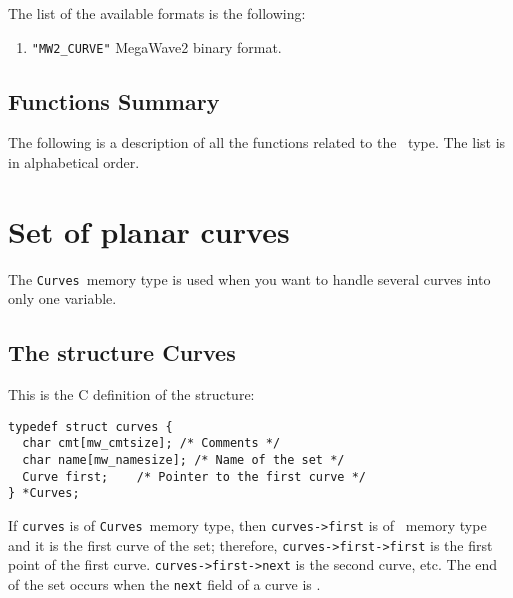The list of the available formats is the following:
\begin{enumerate}
\item \verb+"MW2_CURVE"+ MegaWave2 binary format.
\end{enumerate}


\subsection{Functions Summary}
\label{curves-polygons_curve_function}

The following is a description of all the functions related to 
the \curve\ type. The list is in alphabetical order.

\newpage %



\section{Set of planar curves}


\label{curves-polygons_curves}
\def\curves{{\tt Curves}}
\index{structure!\curves}

The \curves\ memory type is used when you want to handle several curves
into only one variable. 

\subsection{The structure Curves}
\label{curves-polygons_curves_structure}

This is the C definition of the structure:
{\small
\begin{verbatim}
typedef struct curves {
  char cmt[mw_cmtsize]; /* Comments */
  char name[mw_namesize]; /* Name of the set */
  Curve first;    /* Pointer to the first curve */
} *Curves;
\end{verbatim}
}

If \verb+curves+ is of \curves\ memory type, then \verb+curves->first+ is
of \curve\ memory type and it is the first curve of the set; 
therefore, \verb+curves->first->first+ is the first point of the first
curve.
\verb+curves->first->next+ is the second curve, etc.
The end of the set occurs when the \verb+next+ field of a curve is
\Null.

